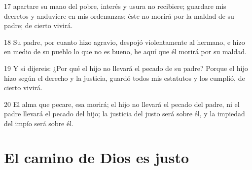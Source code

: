\par 17 apartare su mano del pobre, interés y usura no recibiere; guardare mis decretos y anduviere en mis ordenanzas; éste no morirá por la maldad de su padre; de cierto vivirá.
\par 18 Su padre, por cuanto hizo agravio, despojó violentamente al hermano, e hizo en medio de su pueblo lo que no es bueno, he aquí que él morirá por su maldad.
\par 19 Y si dijereis: ¿Por qué el hijo no llevará el pecado de su padre? Porque el hijo hizo según el derecho y la justicia, guardó todos mis estatutos y los cumplió, de cierto vivirá.
\par 20 El alma que pecare, esa morirá; el hijo no llevará el pecado del padre, ni el padre llevará el pecado del hijo; la justicia del justo será sobre él, y la impiedad del impío será sobre él.

\section*{El camino de Dios es justo}

